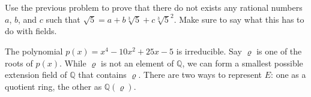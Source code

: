 \documentclass[10pt]{exam}
\def\Q{\mathbb Q}
\begin{document}
\begin{questions}
	
	\question[6] Use the previous problem to prove that there do not exists any rational numbers $a$, $b$, and $c$ such that $\sqrt{5} = a + b\sqrt[3]{5} + c \sqrt[3]{5}^2$.  Make sure to say what this has to do with fields.
	\begin{solution}

	\end{solution}
	\vfill
	\vfill
	\clearpage



\clearpage


\question[24] The polynomial $p(x) = x^4 - 10x^2 + 25x - 5$ is irreducible. Say $\varrho$ is one of the roots of $p(x)$.  While $\varrho$ is not an element of $\Q$, we can form a smallest possible extension field of $\Q$ that contains $\varrho$.  There are two ways to represent $E$: one as a quotient ring, the other as $\Q(\varrho)$.  
\begin{parts}


\end{parts}
\end{questions}
\end{document}
